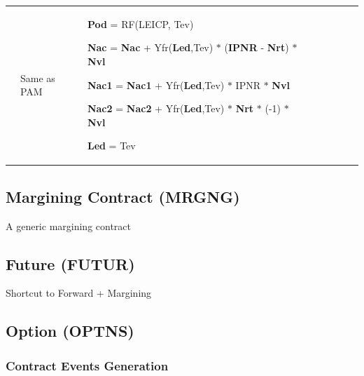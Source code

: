\documentclass[9pt,oneside]{amsart}
\begin{document}
\begin{table}[H]
\begin{tabular}{p{0.49in}p{2.81in}p{2.62in}p{0.15in}p{0.05in}p{0.23in}p{0.01in}p{0.02in}}
\hhline{---}
\multicolumn{1}{|p{0.49in}}{CD} & 
\multicolumn{1}{|p{2.81in}}{Same as PAM} & 
\multicolumn{1}{|p{2.62in}}{\textbf{Pod }= RF(LEICP, Tev) \par \textbf{Nac }= \textbf{Nac }+ Yfr(\textbf{Led},Tev) $\ast$  (\textbf{IPNR }- \textbf{Nrt})\textbf{ }$\ast$  \textbf{Nvl} \par \textbf{Nac1 }= \textbf{Nac1 }+ Yfr(\textbf{Led},Tev) $\ast$  IPNR\textbf{ }$\ast$  \textbf{Nvl} \par \textbf{Nac2 }= \textbf{Nac2 }+ Yfr(\textbf{Led},Tev) $\ast$  \textbf{Nrt }$\ast$  (-1)\textbf{ }$\ast$  \textbf{Nvl} \par \textbf{Led }= Tev} & 

\hhline{---}

\end{tabular}
 \end{table}




\vspace{\baselineskip}

\vspace{\baselineskip}

\vspace{\baselineskip}
\subsection{Margining Contract (MRGNG)}
A generic margining contract

\subsection{Future (FUTUR)}
Shortcut to Forward + Margining

\subsection{Option (OPTNS)}
\subsubsection{Contract Events Generation}


\end{document}
